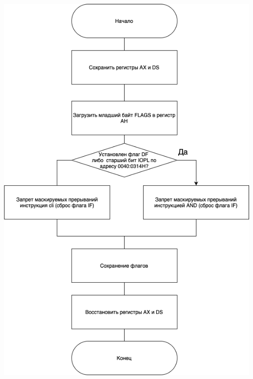 \documentclass[a4paper,14pt]{article}
\begin{document}
\begin{center}
	\includegraphics[scale=0.75]{sub_1.png}
\end{center}
\end{document}
